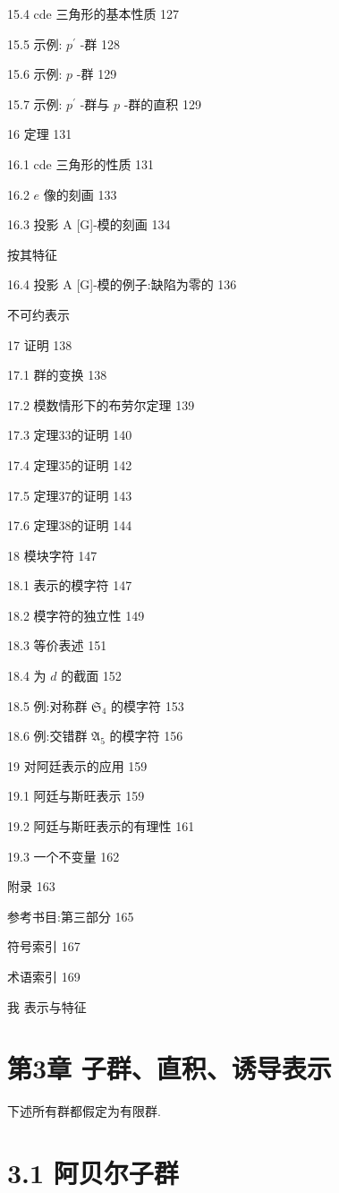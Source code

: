 \documentclass[10pt]{article}
\begin{document}
15.4 cde 三角形的基本性质 127

15.5 示例: \({p}^{\prime }\) -群 128

15.6 示例: \(p\) -群 129

15.7 示例: \({p}^{\prime }\) -群与 \(p\) -群的直积 129

16 定理 131

16.1 cde 三角形的性质 131

16.2 \(e\) 像的刻画 133

16.3 投影 A [G]-模的刻画 134

按其特征

16.4 投影 A [G]-模的例子:缺陷为零的 136

不可约表示

17 证明 138

17.1 群的变换 138

17.2 模数情形下的布劳尔定理 139

17.3 定理33的证明 140

17.4 定理35的证明 142

17.5 定理37的证明 143

17.6 定理38的证明 144

18 模块字符 147

18.1 表示的模字符 147

18.2 模字符的独立性 149

18.3 等价表述 151

18.4 为 \(d\) 的截面 152

18.5 例:对称群 \({\mathfrak{S}}_{4}\) 的模字符 153

18.6 例:交错群 \({\mathfrak{A}}_{5}\) 的模字符 156

19 对阿廷表示的应用 159

19.1 阿廷与斯旺表示 159

19.2 阿廷与斯旺表示的有理性 161

19.3 一个不变量 162

附录 163

参考书目:第三部分 165

符号索引 167

术语索引 169

我 表示与特征



\section*{第3章 子群、直积、诱导表示}

下述所有群都假定为有限群.

\section*{3.1 阿贝尔子群}
\end{document}
